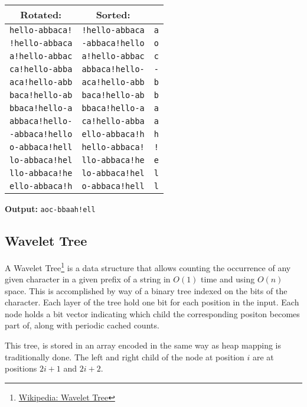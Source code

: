 \documentclass[12pt]{article}
\begin{document}
\vspace{0.75em}
\noindent\begin{tabular}{ c|c|c }
  Rotated: & Sorted: \\ 
  \hline
  {\tt hello-abbaca!} & {\tt !hello-abbaca} & {\tt a} \\
  {\tt !hello-abbaca} & {\tt -abbaca!hello} & {\tt o} \\
  {\tt a!hello-abbac} & {\tt a!hello-abbac} & {\tt c} \\
  {\tt ca!hello-abba} & {\tt abbaca!hello-} & {\tt -} \\
  {\tt aca!hello-abb} & {\tt aca!hello-abb} & {\tt b} \\
  {\tt baca!hello-ab} & {\tt baca!hello-ab} & {\tt b} \\
  {\tt bbaca!hello-a} & {\tt bbaca!hello-a} & {\tt a} \\
  {\tt abbaca!hello-} & {\tt ca!hello-abba} & {\tt a} \\
  {\tt -abbaca!hello} & {\tt ello-abbaca!h} & {\tt h} \\
  {\tt o-abbaca!hell} & {\tt hello-abbaca!} & {\tt !} \\
  {\tt lo-abbaca!hel} & {\tt llo-abbaca!he} & {\tt e} \\
  {\tt llo-abbaca!he} & {\tt lo-abbaca!hel} & {\tt l} \\
  {\tt ello-abbaca!h} & {\tt o-abbaca!hell} & {\tt l} \\
\end{tabular}

\vspace{0.75em}
\noindent\textbf{Output:} {\tt aoc-bbaah!ell}

\subsection{Wavelet Tree}
A Wavelet Tree\footnote{\href{https://en.wikipedia.org/wiki/Wavelet_Tree}{Wikipedia: Wavelet Tree}}
 is a data structure that allows counting the occurrence of any given character
 in a given prefix of a string in $O(1)$ time and using $O(n)$ space.
This is accomplished by way of a binary tree indexed on the bits of the character.
Each layer of the tree hold one bit for each position in the input.
Each node holds a bit vector indicating which child the corresponding positon
 becomes part of, along with periodic cached counts.


This tree, is stored in an array encoded in the same way as heap mapping is
 traditionally done.
The left and right child of the node at position $i$ are at positions $2i + 1$
 and $2i + 2$.
\end{document}
